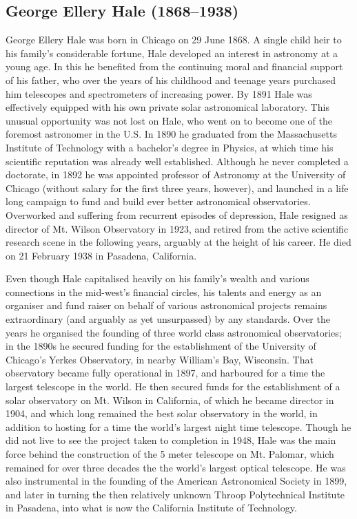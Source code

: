 \subsection[George \scshape{Hale}]{George Ellery Hale (1868--1938)}\label{bio:hale}
George Ellery Hale was born in Chicago on 29 June 1868. A single child heir to his family's considerable fortune, Hale developed an interest in astronomy at a young age. In this he benefited from the continuing moral and financial support of his father, who over the years of his childhood and teenage years purchased him telescopes and spectrometers of increasing power. By 1891 Hale was effectively equipped with his own private solar astronomical laboratory. This unusual opportunity was not lost on Hale, who went on to become one of the foremost astronomer in the U.S. In 1890 he graduated from the Massachusetts Institute of Technology with a bachelor's degree in Physics, at which time his scientific reputation was already well established. Although he never completed a doctorate, in 1892 he was appointed professor of Astronomy at the University of Chicago (without salary for the first three years, however), and launched in a life long campaign to fund and build ever better astronomical observatories. Overworked and suffering from recurrent episodes of depression, Hale resigned as director of Mt. Wilson Observatory in 1923, and retired from the active scientific research scene in the following years, arguably at the height of his career. He died on 21 February 1938 in Pasadena, California.

Even though Hale capitalised heavily on his family's wealth and various connections in the mid-west's financial circles, his talents and energy as an organiser and fund raiser on behalf of various astronomical projects remains extraordinary (and arguably as yet unsurpassed) by any standards. Over the years he organised the founding of three world class astronomical observatories; in the 1890s he secured funding for the establishment of the University of Chicago's Yerkes Observatory, in nearby William's Bay, Wisconsin. That observatory became fully operational in 1897, and harboured for a time the largest telescope in the world. He then secured funds for the establishment of a solar observatory on Mt. Wilson in California, of which he became director in 1904, and which long remained the best solar observatory in the world, in addition to hosting for a time the world's largest night time telescope. Though he did not live to see the project taken to completion in 1948, Hale was the main force behind the construction of the 5 meter telescope on Mt. Palomar, which remained for over three decades the the world's largest optical telescope. He was also instrumental in the founding of the American Astronomical Society in 1899, and later in turning the then relatively unknown Throop Polytechnical Institute in Pasadena, into what is now the California Institute of Technology.

